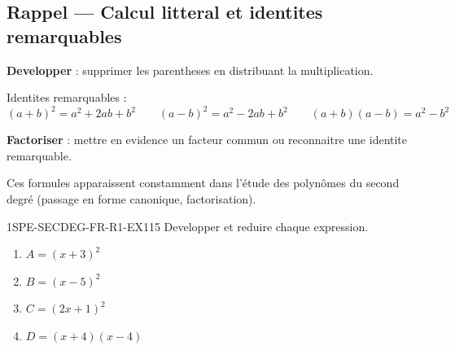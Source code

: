 

\subsection*{Rappel — Calcul litteral et identites remarquables}

\textbf{Developper} : supprimer les parentheses en distribuant la multiplication.

Identites remarquables :
\[
  (a+b)^2 = a^2 + 2ab + b^2 \qquad (a-b)^2 = a^2 - 2ab + b^2 \qquad (a+b)(a-b) = a^2 - b^2
\]

\textbf{Factoriser} : mettre en evidence un facteur commun ou reconnaitre une identite remarquable.

Ces formules apparaissent constamment dans l'étude des polynômes du second degré (passage en forme canonique, factorisation).


\begin{exercice}{1SPE-SECDEG-FR-R1-EX1}{1}{5}
Developper et reduire chaque expression.
\begin{enumerate}
  \item $A = (x + 3)^2$
  \item $B = (x - 5)^2$
  \item $C = (2x + 1)^2$
  \item $D = (x + 4)(x - 4)$
\end{enumerate}
\end{exercice}


